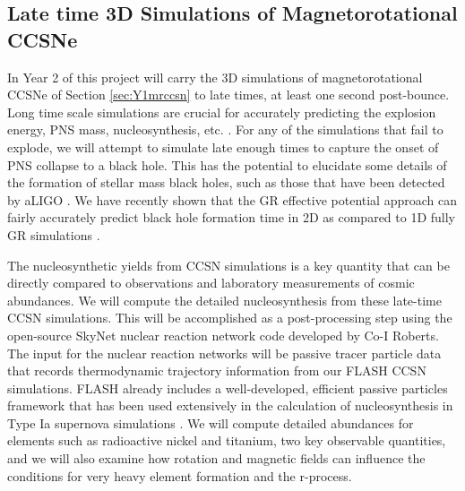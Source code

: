 %


\vspace{0.1in} 

\subsection{Late time 3D Simulations of Magnetorotational CCSNe}
\label{sec:Y2late}

In Year 2 of this project will carry the 3D simulations of magnetorotational CCSNe of Section \ref{sec:Y1mrccsn} to late times, at least one second post-bounce.
Long time scale simulations are crucial for accurately predicting the explosion energy, PNS mass, nucleosynthesis, etc. \citep{Bruenn:2016, Muller:2017}.
For any of the simulations that fail to explode, we will attempt to simulate late enough times to capture the onset of PNS collapse to a black hole.
This has the potential to elucidate some details of the formation of stellar mass black holes, such as those that have been detected by aLIGO \citep{Abbott:2016, Abbott:2017}.
We have recently shown \citep{Pan:2017} that the GR effective potential approach can fairly accurately predict black hole formation time in 2D as compared to 1D fully GR simulations \citep{OConnor:2011}.

The nucleosynthetic yields from CCSN simulations is a key quantity that can be directly compared to observations and laboratory measurements of cosmic abundances.
We will compute the detailed nucleosynthesis from these late-time CCSN simulations.
This will be accomplished as a post-processing step using the open-source SkyNet nuclear reaction network code developed by Co-I Roberts.
The input for the nuclear reaction networks will be passive tracer particle data that records thermodynamic trajectory information from our FLASH CCSN simulations.
FLASH already includes a well-developed, efficient passive particles framework that has been used extensively in the calculation of nucleosynthesis in Type Ia supernova simulations \citep[e.g.,][]{Long:2014}.
We will compute detailed abundances for elements such as radioactive nickel and titanium, two key observable quantities, and we will also examine how rotation and magnetic fields can influence the conditions for very heavy element formation and the r-process.

